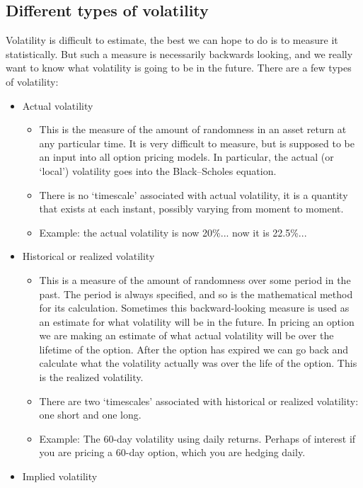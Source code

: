 \subsection{Different types of volatility}
Volatility is difficult to estimate, the best we can hope to do is to measure it statistically. But such a measure is necessarily backwards looking, and we really want to know what volatility is going to be in the future. There are a few types of volatility:
\begin{itemize}
	\setlength\itemsep{0em}
	\item Actual volatility
	\begin{itemize}
		\setlength\itemsep{0em}
		\item This is the measure of the amount of randomness in an asset return at any particular time. It is very difficult to measure, but is supposed to be an input into all option pricing models. In particular, the actual (or `local') volatility goes into the Black–Scholes equation.
		\item There is no `timescale' associated with actual volatility, it is a quantity that exists at each instant, possibly varying from moment to moment.
		\item Example: the actual volatility is now 20\%... now it is 22.5\%...
	\end{itemize}
	\item Historical or realized volatility
	\begin{itemize}
		\setlength\itemsep{0em}
		\item This is a measure of the amount of randomness over some period in the past. The period is always specified, and so is the mathematical method for its calculation. Sometimes this backward-looking measure is used as an estimate for what volatility will be in the future. In pricing an option we are making an estimate of what actual volatility will be over the lifetime of the option. After the option has expired we can go back and calculate what the volatility actually was over the life of the option. This is the realized volatility.
		\item There are two `timescales' associated with historical or realized volatility: one short and one long.
		\item Example: The 60-day volatility using daily returns. Perhaps of interest if you are pricing a 60-day option, which you are hedging daily.
	\end{itemize}
	\item Implied volatility
	\begin{itemize}

\end{itemize}
\end{itemize}
